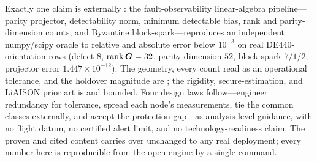 Exactly one claim is externally \Validated{}: the fault-observability linear-algebra
pipeline---parity projector, detectability norm, minimum detectable bias, rank and
parity-dimension counts, and Byzantine block-spark---reproduces an independent numpy/scipy
oracle to relative and absolute error below $10^{-3}$ on real DE440-orientation rows (defect
$8$, $\operatorname{rank}\bm{G}=32$, parity dimension $52$, block-spark $7/1/2$; projector error
$1.447\times10^{-12}$). The geometry, every count read as an operational tolerance, and the
holdover magnitude are \Modelled{}; the rigidity, secure-estimation, and LiAISON prior art is
\Cited{} and bounded. Four design laws follow---engineer redundancy for tolerance, spread each
node's measurements, tie the common classes externally, and accept the protection gap---as
analysis-level guidance, with no flight datum, no certified alert limit, and no
technology-readiness claim. The proven and cited content carries over unchanged to any real
deployment; every number here is reproducible from the open engine by a single command.
